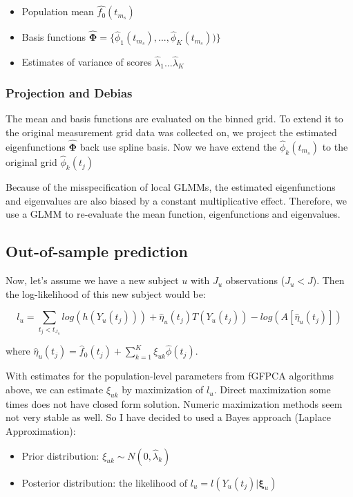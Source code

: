 \documentclass[
]{article}
\providecommand{\tightlist}{%
  \setlength{\itemsep}{0pt}\setlength{\parskip}{0pt}}
\begin{document}
\begin{itemize}
\tightlist
\item
  Population mean \(\hat{f_0}(t_{m_s})\)
\item
  Basis functions
  \(\hat{\mathbf{\Phi}} = \{\hat{\phi}_1(t_{m_s}), ...,\hat{\phi}_K(t_{m_s}))\}\)
\item
  Estimates of variance of scores \(\hat{\lambda}_1...\hat{\lambda}_K\)
\end{itemize}

\subsubsection{Projection and Debias}\label{projection-and-debias}

The mean and basis functions are evaluated on the binned grid. To extend
it to the original measurement grid data was collected on, we project
the estimated eigenfunctions \(\hat{\mathbf{\Phi}}\) back use spline
basis. Now we have extend the \(\hat{\phi}_k(t_{m_s})\) to the original
grid \(\hat{\phi}_k(t_j)\)

Because of the misspecification of local GLMMs, the estimated
eigenfunctions and eigenvalues are also biased by a constant
multiplicative effect. Therefore, we use a GLMM to re-evaluate the mean
function, eigenfunctions and eigenvalues.

\subsection{Out-of-sample prediction}\label{out-of-sample-prediction}

Now, let's assume we have a new subject \(u\) with \(J_u\) observations
(\(J_u < J\)). Then the log-likelihood of this new subject would be:

\[l_u=\sum_{t_j<t_{J_u}}log(h(Y_u(t_j)))+\hat{\eta}_u(t_j)T(Y_u(t_j))-log(A[\hat{\eta}_u(t_j)])\]

where
\(\hat{\eta}_u(t_j) = \hat{f}_0(t_j)+\sum_{k=1}^K \xi_{uk}\hat{\phi}(t_j)\).

With estimates for the population-level parameters from fGFPCA
algorithms above, we can estimate \(\xi_{uk}\) by maximization of
\(l_u\). Direct maximization some times does not have closed form
solution. Numeric maximization methods seem not very stable as well. So
I have decided to used a Bayes approach (Laplace Approximation):

\begin{itemize}
\tightlist
\item
  Prior distribution: \(\xi_{uk} \sim N(0, \hat{\lambda}_k)\)
\item
  Posterior distribution: the likelihood of
  \(l_u =l(Y_u(t_j)|\mathbf{\xi}_u)\)
\end{itemize}
\end{document}
